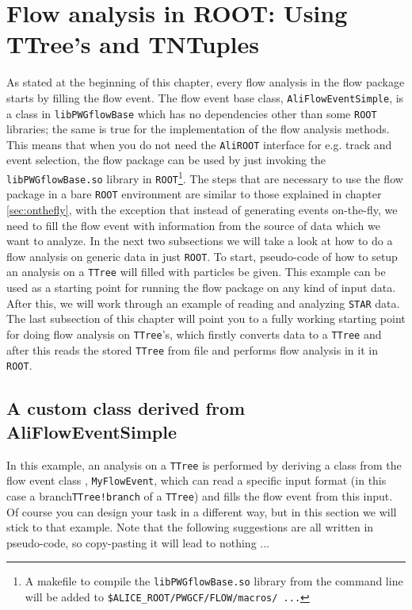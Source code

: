 \documentclass[a4paper]{book}
\numberwithin{equation}{subsection}
\begin{document}
\section{Flow analysis in ROOT: Using TTree's and TNTuples}
As stated at the beginning of this chapter, every flow analysis in the flow package starts by filling the flow event. The flow event base class, \texttt{AliFlowEventSimple}, is a class in \texttt{libPWGflowBase} which has no dependencies other than some \texttt{ROOT} libraries; the same is true for the implementation of the flow analysis methods. This means that when you do not need the \texttt{AliROOT} interface for e.g. track and event selection, the flow package can be used by just invoking the \texttt{libPWGflowBase.so} library in \texttt{ROOT}\footnote{A makefile to compile the \texttt{libPWGflowBase.so} library from the command line will be added to \texttt{\$ALICE\_ROOT/PWGCF/FLOW/macros/ ...}}. The steps that are necessary to use the flow package in a bare \texttt{ROOT} environment are similar to those explained in chapter \ref{sec:onthefly}, with the exception that instead of generating events on-the-fly, we need to fill the flow event with information from the source of data which we want to analyze. In the next two subsections we will take a look at how to do a flow analysis on generic data in just \texttt{ROOT}. To start, pseudo-code of how to setup an analysis on a \texttt{TTree} will filled with particles be given. This example can be used as a starting point for running the flow package on any kind of input data. After this, we will work through an example of reading and analyzing \texttt{STAR} data. The last subsection of this chapter will point you to a fully working starting point for doing flow analysis on \texttt{TTree}'s, which firstly converts data to a \texttt{TTree} and after this reads the stored \texttt{TTree} from file and performs flow analysis in it in \texttt{ROOT}.

\subsection{A custom class derived from AliFlowEventSimple}
In this example, an analysis on a \texttt{TTree} is performed by deriving a class from the flow event class , \texttt{MyFlowEvent}, which can read a specific input format (in this case a branch\texttt{TTree!branch} of a \texttt{TTree}) and fills the flow event from this input. Of course you can design your task in a different way, but in this section we will stick to that example. Note that the following suggestions are all written in pseudo-code, so copy-pasting it will lead to nothing ...
\end{document}
